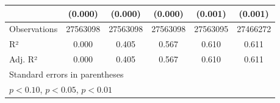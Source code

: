 \begin{table}[htbp]
\begin{tabular}{l*{5}{c}}
                    &     (0.000)         &     (0.000)         &     (0.000)         &     (0.001)         &     (0.001)         \\
\midrule
Observations        &    27563098         &    27563098         &    27563098         &    27563095         &    27466272         \\
R²                  &       0.000         &       0.405         &       0.567         &       0.610         &       0.611         \\
Adj. R²             &       0.000         &       0.405         &       0.567         &       0.610         &       0.611         \\
\bottomrule
\multicolumn{6}{l}{\footnotesize Standard errors in parentheses}\\
\multicolumn{6}{l}{\footnotesize \sym{*} \(p<0.10\), \sym{**} \(p<0.05\), \sym{***} \(p<0.01\)}\\
\end{tabular}
\end{table}
